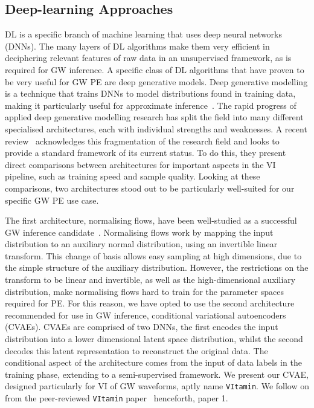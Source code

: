 \documentclass[a4paper]{jpconf}
\begin{document}
\subsection{Deep-learning Approaches}\label{intro:dl}

DL is a specific branch of machine learning that uses deep neural networks (DNNs). The many layers of DL algorithms make them very efficient in deciphering relevant features of raw data in an unsupervised framework, as is required for GW inference. A specific class of DL algorithms that have proven to be very useful for GW PE are deep generative models. Deep generative modelling is a technique that trains DNNs to model distributions found in training data, making it particularly useful for approximate inference~\cite{1807.03653}. The rapid progress of applied deep generative modelling research has split the field into many different specialised architectures, each with individual strengths and weaknesses. A recent review~\cite{bond2021deep} acknowledges this fragmentation of the research field and looks to provide a standard framework of its current status. To do this, they present direct comparisons between architectures for important aspects in the VI pipeline, such as training speed and sample quality. Looking at these comparisons, two architectures stood out to be particularly well-suited for our specific GW PE use case. 

The first architecture, normalising flows, have been well-studied as a successful GW inference candidate~\cite{williams2021nested,papamakarios2019normalizing}. Normalising flows work by mapping the input distribution to an auxiliary normal distribution, using an invertible linear transform. This change of basis allows easy sampling at high dimensions, due to the simple structure of the auxiliary distribution. However, the restrictions on the transform to be linear and invertible, as well as the high-dimensional auxiliary distribution, make normalising flows hard to train for the parameter spaces required for PE. For this reason, we have opted to use the second architecture recommended for use in GW inference, conditional variational autoencoders (CVAEs). CVAEs are comprised of two DNNs, the first encodes the input distribution into a lower dimensional latent space distribution, whilst the second decodes this latent representation to reconstruct the original data. The conditional aspect of the architecture comes from the input of data labels in the training phase, extending to a semi-supervised framework. We present our CVAE, designed particularly for VI of GW waveforms, aptly name \texttt{VItamin}. We follow on from the peer-reviewed \texttt{VItamin} paper~\cite{vitpaper} henceforth, paper 1.
\end{document}

